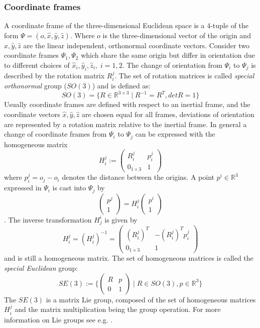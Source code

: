 \documentclass[a4paper,twoside, openright,12pt]{report}
\begin{document}
\subsubsection{Coordinate frames}
A coordinate frame of the three-dimensional Euclidean space is a 4-tuple of the form $ \Psi = (o,\hat{x},\hat{y},\hat{z})$. Where $ o $ is the three-dimensional vector of the origin and $ \hat{x},\hat{y},\hat{z} $ are the linear independent, orthonormal coordinate vectors. Consider two coordinate frames $ \Psi_1,\Psi_2 $ which share the same origin but differ in orientation due to different choices of $ \hat{x}_i,\hat{y}_i,\hat{z}_i, \; i=1,2 $. The change of orientation from $ \Psi_i $ to $ \Psi_j $ is described by the rotation matrix $ R_i^j $. The set of rotation matrices is called \emph{special orthonormal} group ($SO(3)$) \cite{Stramigioli_01b} and is defined as:
\begin{equation}
	SO(3) = \{R \in \mathbb{R}^{3 \times 3} \; | \; R^{-1} = R^T, det R = 1\}
\end{equation}
Usually coordinate frames are defined with respect to an inertial frame, and the coordinate vectors $ \hat{x},\hat{y},\hat{z} $ are chosen equal for all frames, deviations of orientation are represented by a rotation matrix relative to the inertial frame. In general a change of coordinate frames from $ \Psi_i $ to $ \Psi_j $ can be expressed with the homogeneous matrix
\[ H_i^j := \begin{pmatrix}R_i^j & p_i^j \\ 0_{1\times3} & 1\end{pmatrix} \]
where $p_i^j = o_j - o_i$ denotes the distance between the origins. A point $ p^i \in \mathbb{R}^3 $ expressed in $ \Psi_i $ is cast into $\Psi_j$ by
\begin{equation}\label{EQ:coordchange}
	\begin{pmatrix}p^j \\ 1\end{pmatrix} = H_i^j \begin{pmatrix}
		p^i \\ 1\end{pmatrix}
\end{equation}.
The inverse transformation $ H_j^i $ is given by 
\[H_i^j = (H_i^j)^{-1} = \begin{pmatrix}(R_i^j)^T & -(R_i^j)^T p_i^j \\ 0_{1 \times 3} & 1\end{pmatrix} \]
and is still a homogeneous matrix.
The set of homogeneous matrices is called the \emph{special Euclidean} group:
\begin{equation}
	SE(3) := \{\begin{pmatrix}R & p\\0 & 1\end{pmatrix} \; | \; R \in SO(3), p \in \mathbb{R}^3\} 
\end{equation}
The $SE(3)$ is a matrix Lie group, composed of the set of homogeneous matrices $H_i^j$ and the matrix multiplication being the group operation. For more information on Lie groups see e.g. \cite{Stramigioli_01}.
\end{document}
